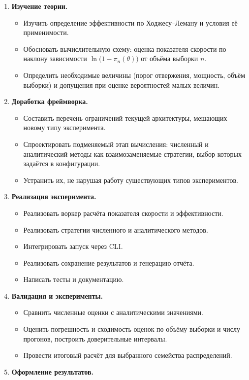 \begin{enumerate}
    \item \textbf{Изучение теории.} 
    \begin{itemize}
        \item Изучить определение эффективности по Ходжесу--Леману и условия её
              применимости.
        \item Обосновать вычислительную схему: оценка показателя скорости по наклону
              зависимости $\ln\bigl(1 - \pi_n(\theta)\bigr)$ от объёма выборки $n$.
        \item Определить необходимые величины (порог отвержения, мощность, объём выборки)
              и допущения при оценке вероятностей малых величин.
    \end{itemize}

    \item \textbf{Доработка фреймворка.} 
    \begin{itemize}
      \item Составить перечень ограничений текущей архитектуры, мешающих новому типу
            эксперимента.
      \item Спроектировать подменяемый этап вычисления: численный и аналитический методы
            как взаимозаменяемые стратегии, выбор которых задаётся в конфигурации.
      \item Устранить их, не нарушая работу существующих типов экспериментов.
    \end{itemize}

    \item \textbf{Реализация эксперимента.} 
    \begin{itemize}
        \item Реализовать воркер расчёта показателя скорости и эффективности.
        \item Реализовать стратегии численного и аналитического методов.
        \item Интегрировать запуск через CLI.
        \item Реализовать сохранение результатов и генерацию отчёта.
        \item Написать тесты и документацию.
    \end{itemize}

    \item \textbf{Валидация и эксперименты.} 
    \begin{itemize}
        \item Сравнить численные оценки с аналитическими значениями.
        \item Оценить погрешность и сходимость оценок по объёму выборки и числу прогонов,
              построить доверительные интервалы.
        \item Провести итоговый расчёт для выбранного семейства распределений.
    \end{itemize}

    \item \textbf{Оформление результатов.} 
\end{enumerate}

\clearpage
